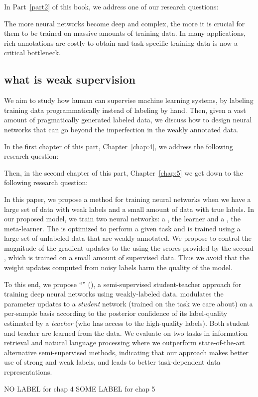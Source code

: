 In Part~\ref{part2} of this book, we address one of our research questions:
\begin{resqbox}
\emph{}
\end{resqbox}


The more neural networks become deep and complex, the more it is crucial for them to be trained on massive amounts of training data.
In many applications, rich annotations are costly to obtain and task-specific training data is now a critical bottleneck. 


\subsection{what is weak supervision}
We aim to study how human can supervise machine learning systems, by labeling training data programmatically instead of labeling by hand. Then, given a vast amount of pragmatically generated labeled data, we discuss how to design neural networks that can go beyond the imperfection in the weakly annotated data.


In the first chapter of this part, Chapter~\ref{chap:4}, we address the following research question:
\begin{resqbox}
\emph{}
\end{resqbox}

Then, in the second chapter of this part, Chapter~\ref{chap:5} we get down to the following research question:
\begin{resqbox}
\emph{}
\end{resqbox}



In this paper, we propose a method for training neural networks when we have a large set of data with weak labels and a small amount of data with true labels. In our proposed model, we train two neural networks: a \tnet, the learner and a \cnet, the meta-learner. 
The \tnet is optimized to perform a given task and is trained using a large set of unlabeled data that are weakly annotated. We propose to control the magnitude of the gradient updates to the \tnet using the scores provided by the second \cnet, which is trained on a small amount of supervised data. Thus we avoid that the weight updates computed from noisy labels harm the quality of the \tnet model.

To this end, we propose ``\fwlfulllc'' (\fwl), a semi-supervised student-teacher approach for training deep neural networks using weakly-labeled data. \fwl modulates the parameter updates to a \emph{student} network (trained on the task we care about) on a per-sample basis according to the posterior confidence of its label-quality estimated by a \emph{teacher} (who has access to the high-quality labels).  Both student and teacher are learned from the data. We evaluate \fwl on two tasks in information retrieval and natural language processing where we outperform state-of-the-art alternative semi-supervised methods, indicating that our approach makes better use of strong and weak labels, and leads to better task-dependent data representations.


NO LABEL for chap 4
SOME LABEL for chap 5

\medskip



